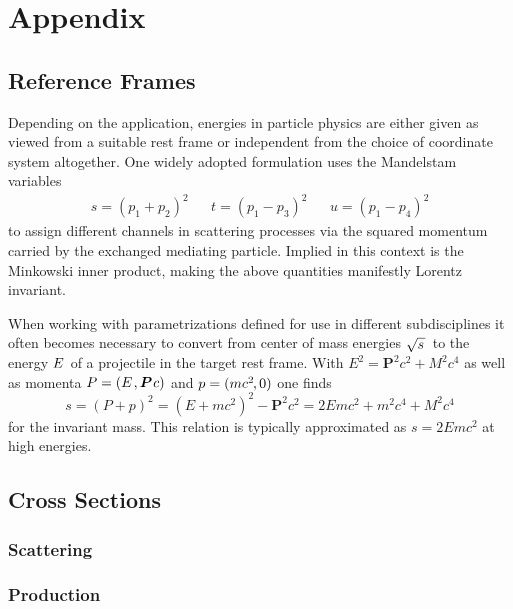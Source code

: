 \chapter*{Appendix}
\label{ch:appendix}

\section{Reference Frames}
\label{sec:frames}

Depending on the application, energies in particle physics are either given as viewed from a suitable rest frame or
independent from the choice of coordinate system altogether. One widely adopted formulation uses the Mandelstam variables
\begin{align*}
	s = (p_1 + p_2)^2 &&
	t = (p_1 - p_3)^2 &&
	u = (p_1 - p_4)^2
\end{align*}
to assign different channels in scattering processes via the squared momentum carried by the exchanged mediating particle.
Implied in this context is the Minkowski inner product, making the above quantities manifestly Lorentz invariant.

When working with parametrizations defined for use in different subdisciplines it often becomes necessary to convert from
center of mass energies $\sqrt{s \kern+1.0pt} \kern+1.0pt$ to the energy $\kern-0.5pt E \kern+1.0pt$ of a projectile in the target rest
frame. With $E^2 = \bm{P}^2 c^2 + M^2 c^4$ as well as momenta $P = (E \kern+1.0pt , \bm{P} \kern+0.75pt c)$ and
$p = (m c^2 \kern-1.0pt , 0)$ one finds
\begin{equation*}
	s = (P + p)^2 = (E + m c^2)^2 - \bm{P}^2 c^2 = 2E m c^2 + m^2 c^4 + M^2 c^4
\end{equation*}
for the invariant mass. This relation is typically approximated as $s = 2E m c^2$ at high energies.


\section{Cross Sections}
\label{sec:cross}

\subsection*{Scattering}

\autocite{Fagundes_2012}

\subsection*{Production}

